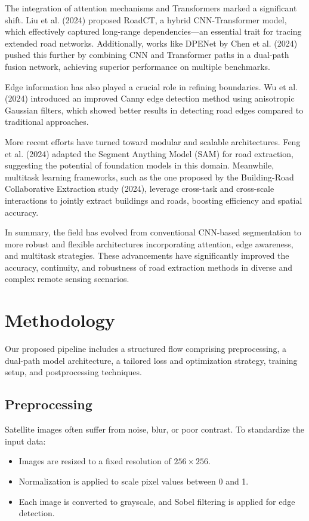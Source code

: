\documentclass[conference]{IEEEtran}
\begin{document}
The integration of attention mechanisms and Transformers marked a significant shift. Liu et al. (2024) proposed RoadCT, a hybrid CNN-Transformer model, which effectively captured long-range dependencies—an essential trait for tracing extended road networks. Additionally, works like DPENet by Chen et al. (2024) pushed this further by combining CNN and Transformer paths in a dual-path fusion network, achieving superior performance on multiple benchmarks.

Edge information has also played a crucial role in refining boundaries. Wu et al. (2024) introduced an improved Canny edge detection method using anisotropic Gaussian filters, which showed better results in detecting road edges compared to traditional approaches.

More recent efforts have turned toward modular and scalable architectures. Feng et al. (2024) adapted the Segment Anything Model (SAM) for road extraction, suggesting the potential of foundation models in this domain. Meanwhile, multitask learning frameworks, such as the one proposed by the Building-Road Collaborative Extraction study (2024), leverage cross-task and cross-scale interactions to jointly extract buildings and roads, boosting efficiency and spatial accuracy.

In summary, the field has evolved from conventional CNN-based segmentation to more robust and flexible architectures incorporating attention, edge awareness, and multitask strategies. These advancements have significantly improved the accuracy, continuity, and robustness of road extraction methods in diverse and complex remote sensing scenarios.

\section{Methodology}

Our proposed pipeline includes a structured flow comprising preprocessing, a dual-path model architecture, a tailored loss and optimization strategy, training setup, and postprocessing techniques.

\subsection{Preprocessing}

Satellite images often suffer from noise, blur, or poor contrast. To standardize the input data:

\begin{itemize}
    \item Images are resized to a fixed resolution of $256 \times 256$.
    \item Normalization is applied to scale pixel values between 0 and 1.
    \item Each image is converted to grayscale, and Sobel filtering is applied for edge detection.
\end{itemize}
\end{document}
